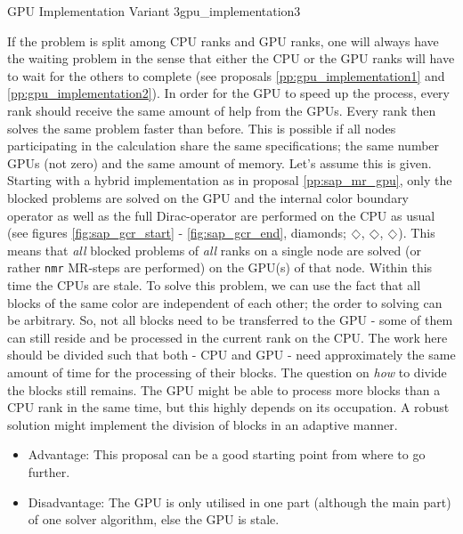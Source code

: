 \documentclass{article}
\DeclareRobustCommand{\diamond}{%
  \mathbin{\text{\scalebox{.75}{\rotatebox[origin=c]{45}{$\Box$}}}}%
}
\theoremstyle{plain} %
\theoremstyle{convention} %
\theoremstyle{remark} %
\def\code#1{\texttt{#1}}
\numberwithin{equation}{section}
\begin{document}
\begin{proposal}{GPU Implementation Variant 3}{gpu_implementation3} %

If the problem is split among CPU ranks and GPU ranks, one will always have the waiting problem in the sense that either the CPU or the GPU ranks will have to wait for the others to complete (see proposals \ref{pp:gpu_implementation1} and \ref{pp:gpu_implementation2}). In order for the GPU to speed up the process, every rank should receive the same amount of help from the GPUs. Every rank then solves the same problem faster than before. This is possible if all nodes participating in the calculation share the same specifications; the same number GPUs (not zero) and the same amount of memory. Let's assume this is given. Starting with a hybrid implementation as in proposal \ref{pp:sap_mr_gpu}, only the blocked problems are solved on the GPU and the internal color boundary operator as well as the full Dirac-operator are performed on the CPU as usual (see figures \ref{fig:sap_gcr_start} - \ref{fig:sap_gcr_end}, diamonds; \textcolor{cbrown}{$\diamond$}, \textcolor{cred}{$\diamond$}, \textcolor{cblue}{$\diamond$}). This means that \textit{all} blocked problems of \textit{all} ranks on a single node are solved (or rather \code{nmr} MR-steps are performed) on the GPU(s) of that node. Within this time the CPUs are stale. To solve this problem, we can use the fact that all blocks of the same color are independent of each other; the order to solving can be arbitrary. So, not all blocks need to be transferred to the GPU - some of them can still reside and be processed in the current rank on the CPU. The work here should be divided such that both - CPU and GPU - need approximately the same amount of time for the processing of their blocks. The question on \textit{how} to divide the blocks still remains. The GPU might be able to process more blocks than a CPU rank in the same time, but this highly depends on its occupation. A robust solution might implement the division of blocks in an adaptive manner.

\begin{itemize}
    \item Advantage: This proposal can be a good starting point from where to go further.
    \item Disadvantage: The GPU is only utilised in one part (although the main part) of one solver algorithm, else the GPU is stale.
\end{itemize}

\end{proposal}
\end{document}
